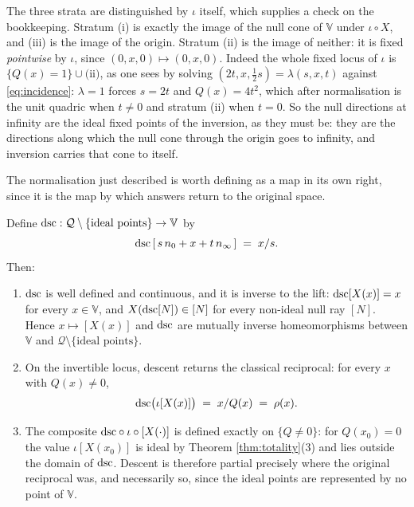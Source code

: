 \begin{remark}\label{rem:strata}
The three strata are distinguished by $\iota$ itself, which supplies a check on the bookkeeping. Stratum (i) is exactly the image of the null cone of $\mathbb{V}$ under $\iota \circ X$, and (iii) is the image of the origin. Stratum (ii) is the image of neither: it is fixed \emph{pointwise} by $\iota$, since $(0,x,0) \mapsto (0,x,0)$. Indeed the whole fixed locus of $\iota$ is $\{Q(x) = 1\} \cup \text{(ii)}$, as one sees by solving $(2t, x, \tfrac12 s) = \lambda(s,x,t)$ against \eqref{eq:incidence}: $\lambda = 1$ forces $s = 2t$ and $Q(x) = 4t^2$, which after normalisation is the unit quadric when $t \neq 0$ and stratum (ii) when $t = 0$. So the null directions at infinity are the ideal fixed points of the inversion, as they must be: they are the directions along which the null cone through the origin goes to infinity, and inversion carries that cone to itself.
\end{remark}

The normalisation just described is worth defining as a map in its own right, since it is the map by which answers return to the original space.

\begin{lemma}\label{lem:descent}
Define $\mathrm{dsc} : \mathcal{Q} \setminus \{\text{ideal points}\} \to \mathbb{V}$ by
\[
\mathrm{dsc}\,[\, s\,n_0 + x + t\,n_\infty \,] \;=\; x/s .
\]
Then:
\begin{enumerate}
\item $\mathrm{dsc}$ is well defined and continuous, and it is inverse to the lift: $\mathrm{dsc}[X(x)] = x$ for every $x \in \mathbb{V}$, and $X(\mathrm{dsc}[N]) \in [N]$ for every non-ideal null ray $[N]$. Hence $x \mapsto [X(x)]$ and $\mathrm{dsc}$ are mutually inverse homeomorphisms between $\mathbb{V}$ and $\mathcal{Q} \setminus \{\text{ideal points}\}$.
\item On the invertible locus, descent returns the classical reciprocal: for every $x$ with $Q(x) \neq 0$,
\[
\mathrm{dsc}\bigl(\iota[X(x)]\bigr) \;=\; x/Q(x) \;=\; \rho(x).
\]
\item The composite $\mathrm{dsc} \circ \iota \circ [X(\cdot)]$ is defined exactly on $\{Q \neq 0\}$: for $Q(x_0) = 0$ the value $\iota[X(x_0)]$ is ideal by Theorem \ref{thm:totality}(3) and lies outside the domain of $\mathrm{dsc}$. Descent is therefore partial precisely where the original reciprocal was, and necessarily so, since the ideal points are represented by no point of $\mathbb{V}$.
\end{enumerate}
\end{lemma}

